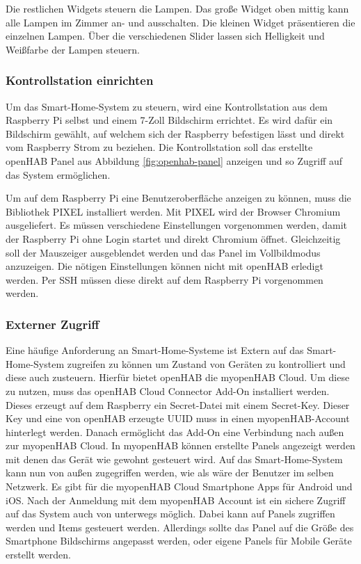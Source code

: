 		Die restlichen Widgets steuern die Lampen. Das große Widget oben mittig kann alle Lampen im Zimmer an- und ausschalten. Die kleinen Widget präsentieren die einzelnen Lampen. Über die verschiedenen Slider lassen sich Helligkeit und Weißfarbe der Lampen steuern.
		
		\subsubsection{Kontrollstation einrichten}
		Um das Smart-Home-System zu steuern, wird eine Kontrollstation aus dem Raspberry Pi selbst und einem 7-Zoll Bildschirm errichtet. Es wird dafür ein Bildschirm gewählt, auf welchem sich der Raspberry befestigen lässt und direkt vom Raspberry Strom zu beziehen.
		Die Kontrollstation soll das erstellte openHAB Panel aus Abbildung \ref{fig:openhab-panel} anzeigen und so Zugriff auf das System ermöglichen.

		Um auf dem Raspberry Pi eine Benutzeroberfläche anzeigen zu können, muss die Bibliothek PIXEL installiert werden. Mit PIXEL wird der Browser Chromium ausgeliefert. Es müssen verschiedene Einstellungen vorgenommen werden, damit der Raspberry Pi ohne Login startet und direkt Chromium öffnet. Gleichzeitig soll der Mauszeiger ausgeblendet werden und das Panel im Vollbildmodus anzuzeigen. Die nötigen Einstellungen können nicht mit openHAB erledigt werden. Per SSH müssen diese direkt auf dem Raspberry Pi vorgenommen werden.

		\subsubsection{Externer Zugriff}
		Eine häufige Anforderung an Smart-Home-Systeme ist Extern auf das Smart-Home-System zugreifen zu können um Zustand von Geräten zu kontrolliert und diese auch zusteuern. Hierfür bietet openHAB die myopenHAB Cloud. Um diese zu nutzen, muss das openHAB Cloud Connector Add-On installiert werden. Dieses erzeugt auf dem Raspberry ein Secret-Datei mit einem Secret-Key. Dieser Key und eine von openHAB erzeugte UUID muss in einen myopenHAB-Account hinterlegt werden. Danach ermöglicht das Add-On eine Verbindung nach außen zur myopenHAB Cloud.
		In myopenHAB können erstellte Panels angezeigt werden mit denen das Gerät wie gewohnt gesteuert wird. Auf das Smart-Home-System kann nun von außen zugegriffen werden, wie als wäre der Benutzer im selben Netzwerk.
		Es gibt für die myopenHAB Cloud Smartphone Apps für Android und iOS. Nach der Anmeldung mit dem myopenHAB Account ist ein sichere Zugriff auf das System auch von unterwegs möglich. Dabei kann auf Panels zugriffen werden und Items gesteuert werden. Allerdings sollte das Panel auf die Größe des Smartphone Bildschirms angepasst werden, oder eigene Panels für Mobile Geräte erstellt werden.
		
